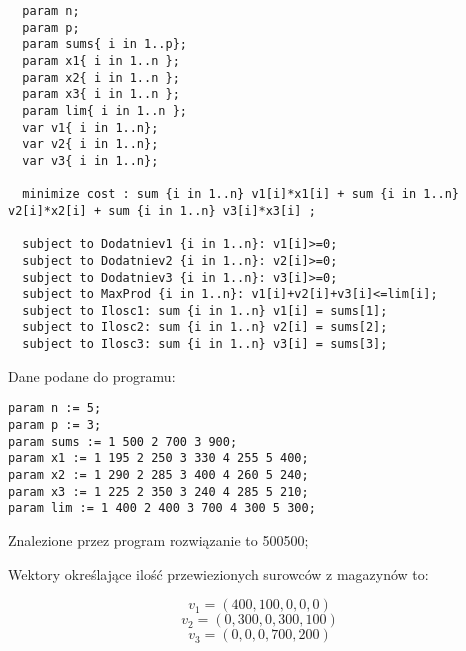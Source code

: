 \documentclass[paper=a4, fontsize=11pt]{scrartcl} %
\numberwithin{equation}{section} %
\numberwithin{figure}{section} %
\numberwithin{table}{section} %
\begin{document}
\begin{lstlisting}
  param n;
  param p;
  param sums{ i in 1..p};
  param x1{ i in 1..n };
  param x2{ i in 1..n };
  param x3{ i in 1..n };
  param lim{ i in 1..n };
  var v1{ i in 1..n};
  var v2{ i in 1..n};
  var v3{ i in 1..n};

  minimize cost : sum {i in 1..n} v1[i]*x1[i] + sum {i in 1..n} v2[i]*x2[i] + sum {i in 1..n} v3[i]*x3[i] ;

  subject to Dodatniev1 {i in 1..n}: v1[i]>=0;
  subject to Dodatniev2 {i in 1..n}: v2[i]>=0;
  subject to Dodatniev3 {i in 1..n}: v3[i]>=0;
  subject to MaxProd {i in 1..n}: v1[i]+v2[i]+v3[i]<=lim[i];
  subject to Ilosc1: sum {i in 1..n} v1[i] = sums[1];
  subject to Ilosc2: sum {i in 1..n} v2[i] = sums[2];
  subject to Ilosc3: sum {i in 1..n} v3[i] = sums[3];
\end{lstlisting}

Dane podane do programu:

\begin{lstlisting}
param n := 5;
param p := 3;
param sums := 1 500 2 700 3 900;
param x1 := 1 195 2 250 3 330 4 255 5 400;
param x2 := 1 290 2 285 3 400 4 260 5 240;
param x3 := 1 225 2 350 3 240 4 285 5 210;
param lim := 1 400 2 400 3 700 4 300 5 300;
\end{lstlisting}

Znalezione przez program rozwiązanie to 500500;

Wektory określające ilość przewiezionych surowców z magazynów to:

\[v_1 = (400, 100, 0, 0, 0)\]
\[v_2 = (0, 300, 0, 300, 100)\]
\[v_3 = (0, 0, 0, 700, 200)\]
\end{document}
